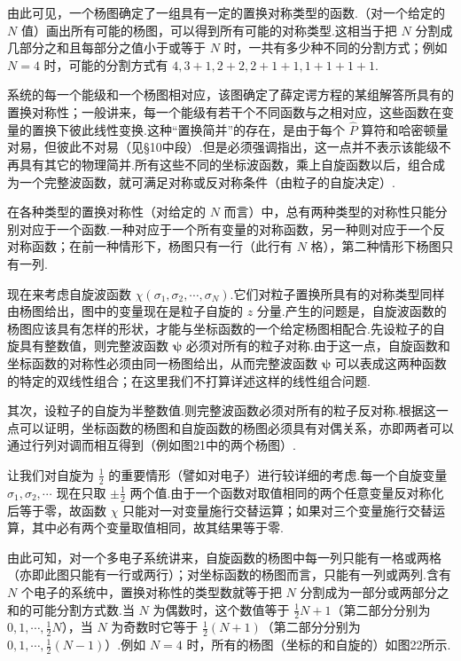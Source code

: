 由此可见，一个杨图确定了一组具有一定的置换对称类型的函数.（对一个给定的 $N$ 值）画出所有可能的杨图，可以得到所有可能的对称类型.这相当于把 $N$ 分割成几部分之和且每部分之值小于或等于 $N$ 时，一共有多少种不同的分割方式；例如 $N=4$ 时，可能的分割方式有 $4,3+1,2+2,2+1+1,1+1+1+1$.

系统的每一个能级和一个杨图相对应，该图确定了薛定谔方程的某组解答所具有的置换对称性；一般讲来，每一个能级有若干个不同函数与之相对应，这些函数在变量的置换下彼此线性变换.这种“置换简并”的存在，是由于每个 $\hat{P}$ 算符和哈密顿量对易，但彼此不对易（见§10中段）.但是必须强调指出，这一点并不表示该能级不再具有其它的物理简并.所有这些不同的坐标波函数，乘上自旋函数以后，组合成为一个完整波函数，就可满足对称或反对称条件（由粒子的自旋决定）.

在各种类型的置换对称性（对给定的 $N$ 而言）中，总有两种类型的对称性只能分别对应于一个函数.一种对应于一个所有变量的对称函数，另一种则对应于一个反对称函数；在前一种情形下，杨图只有一行（此行有 $N$ 格），第二种情形下杨图只有一列.

现在来考虑自旋波函数 $\chi(\sigma_1,\sigma_2,\cdots,\sigma_N)$.它们对粒子置换所具有的对称类型同样由杨图给出，图中的变量现在是粒子自旋的 $z$ 分量.产生的问题是，自旋波函数的杨图应该具有怎样的形状，才能与坐标函数的一个给定杨图相配合.先设粒子的自旋具有整数值，则完整波函数 $\boldsymbol{\psi}$ 必须对所有的粒子对称.由于这一点，自旋函数和坐标函数的对称性必须由同一杨图给出，从而完整波函数 $\boldsymbol{\psi}$ 可以表成这两种函数的特定的双线性组合；在这里我们不打算详述这样的线性组合问题.

其次，设粒子的自旋为半整数值.则完整波函数必须对所有的粒子反对称.根据这一点可以证明，坐标函数的杨图和自旋函数的杨图必须具有对偶关系，亦即两者可以通过行列对调而相互得到（例如图21中的两个杨图）.

让我们对自旋为 $\frac{1}{2}$ 的重要情形（譬如对电子）进行较详细的考虑.每一个自旋变量 $\sigma_1,\sigma_2,\cdots$ 现在只取 $\pm\frac{1}{2}$ 两个值.由于一个函数对取值相同的两个任意变量反对称化后等于零，故函数 $\chi$ 只能对一对变量施行交替运算；如果对三个变量施行交替运算，其中必有两个变量取值相同，故其结果等于零.

由此可知，对一个多电子系统讲来，自旋函数的杨图中每一列只能有一格或两格（亦即此图只能有一行或两行）；对坐标函数的杨图而言，只能有一列或两列.含有 $N$ 个电子的系统中，置换对称性的类型数就等于把 $N$ 分割成为一部分或两部分之和的可能分割方式数.当 $N$ 为偶数时，这个数值等于 $\frac{1}{2}N+1$（第二部分分别为 $0,1,\cdots,\frac{1}{2}N$），当 $N$ 为奇数时它等于 $\frac{1}{2}(N+1)$（第二部分分别为 $0,1,\cdots,\frac{1}{2}(N-1)$）.例如 $N=4$ 时，所有的杨图（坐标的和自旋的）如图22所示.

